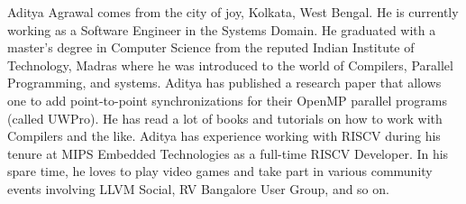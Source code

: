 Aditya Agrawal comes from the city of joy, Kolkata, West Bengal. He is currently working as a Software Engineer in the Systems Domain. He graduated with a master’s degree in Computer Science from the reputed Indian Institute of Technology, Madras where he was introduced to the world of Compilers, Parallel Programming, and systems. Aditya has published a research paper that allows one to add point-to-point synchronizations for their OpenMP parallel programs (called UWPro). He has read a lot of books and tutorials on how to work with Compilers and the like. Aditya has experience working with RISCV during his tenure at MIPS Embedded Technologies as a full-time RISCV Developer. In his spare time, he loves to play video games and take part in various community events involving LLVM Social, RV Bangalore User Group, and so on.
